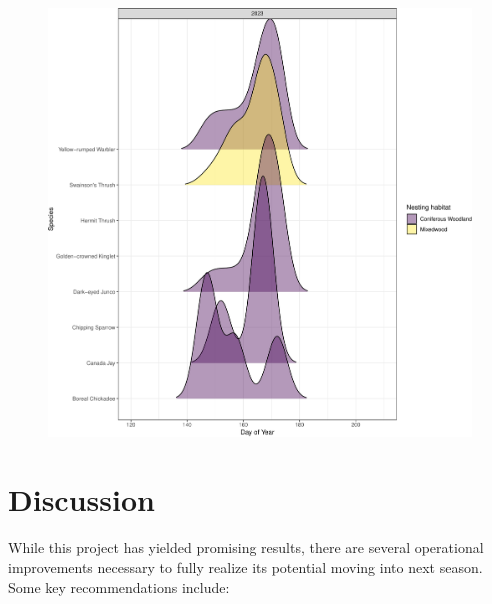 \documentclass[
  letterpaper,
  DIV=11,
  numbers=noendperiod,
  oneside]{scrartcl}
\begin{document}
\begin{figure}


{\centering \includegraphics{knpr-pam_files/figure-pdf/fig-spp-activity-1.pdf}

}

\end{figure}

\hypertarget{discussion}{%
\section{Discussion}\label{discussion}}

While this project has yielded promising results, there are several
operational improvements necessary to fully realize its potential moving
into next season. Some key recommendations include:
\end{document}
